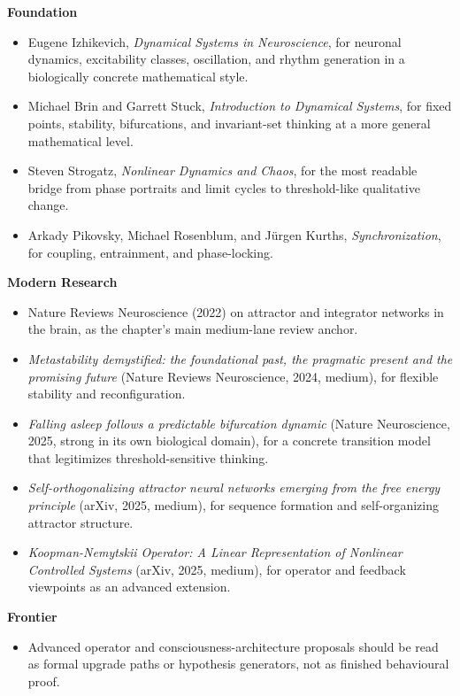\begin{readingbox}
\textbf{Foundation}
\begin{itemize}[nosep]
  \item Eugene Izhikevich, \emph{Dynamical Systems in Neuroscience}, for
        neuronal dynamics, excitability classes, oscillation, and rhythm
        generation in a biologically concrete mathematical style.
  \item Michael Brin and Garrett Stuck, \emph{Introduction to Dynamical
        Systems}, for fixed points, stability, bifurcations, and invariant-set
        thinking at a more general mathematical level.
  \item Steven Strogatz, \emph{Nonlinear Dynamics and Chaos}, for the most
        readable bridge from phase portraits and limit cycles to threshold-like
        qualitative change.
  \item Arkady Pikovsky, Michael Rosenblum, and J\"urgen Kurths,
        \emph{Synchronization}, for coupling, entrainment, and phase-locking.
\end{itemize}
\textbf{Modern Research}
\begin{itemize}[nosep]
  \item Nature Reviews Neuroscience (2022) on attractor and integrator
        networks in the brain, as the chapter's main medium-lane review anchor.
  \item \emph{Metastability demystified: the foundational past, the pragmatic
        present and the promising future} (Nature Reviews Neuroscience, 2024,
        medium), for flexible stability and reconfiguration.
  \item \emph{Falling asleep follows a predictable bifurcation dynamic}
        (Nature Neuroscience, 2025, strong in its own biological domain), for
        a concrete transition model that legitimizes threshold-sensitive
        thinking.
  \item \emph{Self-orthogonalizing attractor neural networks emerging from the
        free energy principle} (arXiv, 2025, medium), for sequence formation
        and self-organizing attractor structure.
  \item \emph{Koopman-Nemytskii Operator: A Linear Representation of Nonlinear
        Controlled Systems} (arXiv, 2025, medium), for operator and feedback
        viewpoints as an advanced extension.
\end{itemize}
\textbf{Frontier}
\begin{itemize}[nosep]
  \item Advanced operator and consciousness-architecture proposals should be
        read as formal upgrade paths or hypothesis generators, not as finished
        behavioural proof.
\end{itemize}
\end{readingbox}

